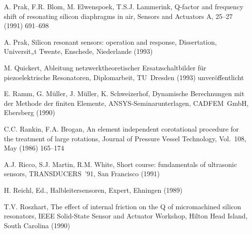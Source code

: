 \begin{thebibliography}{xxx}


 A. Prak, F.R. Blom, M. Elwenspoek, T.S.J. Lammerink, Q-factor and frequency
 shift of resonating silicon diaphragms in air, Sensors and Actuators A,
 25--27 (1991) 691--698

 A. Prak, Silicon resonant sensors: operation and response, Dissertation,
 Universit„t Twente, Enschede, Niederlande (1993)


 M. Quickert, Ableitung netzwerktheoretischer Ersatzschaltbilder für
 piezoelektrische Resonatoren, Diplomarbeit, TU~Dresden (1993)
 unveröffentlicht

 E. Ramm, G. Müller, J. Müller, K. Schweizerhof,
 Dynamische Berechnungen mit der Methode der finiten Elemente,
 {\sf ANSYS}-Seminarunterlagen, CADFEM~GmbH, Ebersberg (1990)

 C.C. Rankin, F.A. Brogan, An element independent corotational procedure
 for the treatment of large rotations, Journal of Pressure Vessel Technology,
 Vol.~108, May (1986) 165--174

 A.J. Ricco, S.J. Martin, R.M. White, Short course: fundamentals of
 ultrasonic sensors, TRANSDUCERS~'91, San Francisco (1991)


 H. Reichl, Ed., Halbleitersensoren, Expert, Ehningen (1989)

 T.V. Roszhart, The effect of internal friction on the Q of micromachined
 silicon resonators, IEEE Solid-State Sensor and Actuator Workshop,
 Hilton Head Island, South Carolina (1990)


\end{thebibliography}
